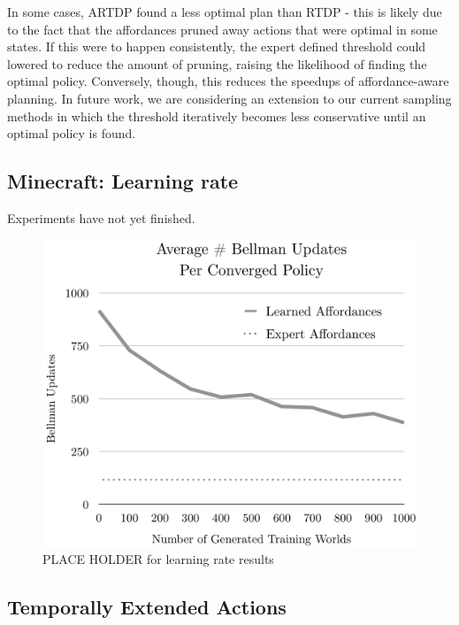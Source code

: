 \documentclass[conference]{IEEEtran}
\begin{document}
In some cases, ARTDP found a less optimal plan than RTDP - this is likely due to 
the fact that the affordances pruned away actions that were optimal in some states. 
If this were to happen consistently, the expert defined threshold could lowered to 
reduce the amount of pruning, raising the likelihood of finding the optimal policy. 
Conversely, though, this reduces the speedups of affordance-aware planning. In 
future work, we are considering an extension to our current sampling methods in 
which the threshold iteratively becomes less conservative until an optimal policy is found.


\subsection{Minecraft: Learning rate}

Experiments have not yet finished.

\begin{figure}[H]
\centering
\includegraphics[scale=0.195]{figures/training_results.png}%
  \caption{PLACE HOLDER for learning rate results}
  \label{fig:training_results}
\end{figure}

\subsection{Temporally Extended Actions}
\end{document}
